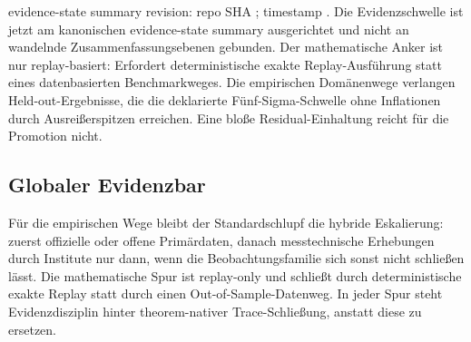 evidence-state summary revision: repo SHA ; timestamp .
Die Evidenzschwelle ist jetzt am kanonischen evidence-state summary ausgerichtet und nicht an wandelnde Zusammenfassungsebenen gebunden. Der mathematische Anker ist nur replay-basiert: Erfordert deterministische exakte Replay-Ausführung statt eines datenbasierten Benchmarkweges. Die empirischen Domänenwege verlangen Held-out-Ergebnisse, die die deklarierte Fünf-Sigma-Schwelle ohne Inflationen durch Ausreißerspitzen erreichen. Eine bloße Residual-Einhaltung reicht für die Promotion nicht.

\subsection{Globaler Evidenzbar}
Für die empirischen Wege bleibt der Standardschlupf die hybride Eskalierung: zuerst offizielle oder offene Primärdaten, danach messtechnische Erhebungen durch Institute nur dann, wenn die Beobachtungsfamilie sich sonst nicht schließen lässt. Die mathematische Spur ist replay-only und schließt durch deterministische exakte Replay statt durch einen Out-of-Sample-Datenweg. In jeder Spur steht Evidenzdisziplin hinter theorem-nativer Trace-Schließung, anstatt diese zu ersetzen.

